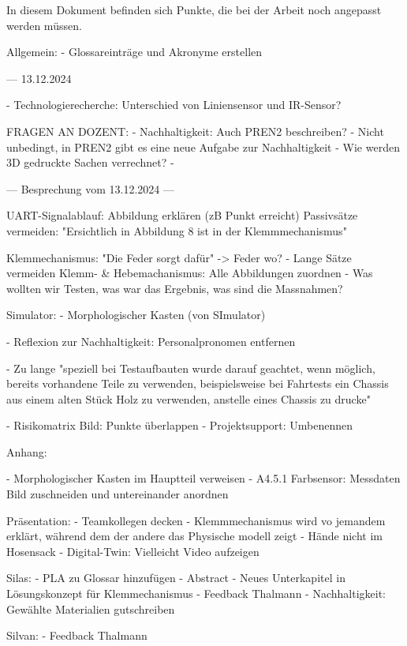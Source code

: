
In diesem Dokument befinden sich Punkte, die bei der Arbeit noch angepasst werden müssen.

Allgemein:
- Glossareinträge und Akronyme erstellen



--- 13.12.2024

- Technologierecherche: Unterschied von Liniensensor und IR-Sensor?




FRAGEN AN DOZENT:
- Nachhaltigkeit: Auch PREN2 beschreiben?
  - Nicht unbedingt, in PREN2 gibt es eine neue Aufgabe zur Nachhaltigkeit
- Wie werden 3D gedruckte Sachen verrechnet?
  - 


--- Besprechung vom 13.12.2024 ---

UART-Signalablauf: Abbildung erklären (zB Punkt erreicht)
Passivsätze vermeiden: "Ersichtlich in Abbildung 8 ist in der Klemmmechanismus"

Klemmechanismus: "Die Feder  sorgt dafür" -> Feder wo?
- Lange Sätze vermeiden
Klemm- \& Hebemachanismus: Alle Abbildungen zuordnen
- Was wollten wir Testen, was  war das Ergebnis, was sind die Massnahmen?

Simulator:
- Morphologischer Kasten (von SImulator)



- Reflexion zur Nachhaltigkeit: Personalpronomen entfernen

- Zu lange "speziell bei Testaufbauten wurde darauf geachtet, wenn möglich, bereits
vorhandene Teile zu verwenden, beispielsweise bei Fahrtests ein Chassis aus einem alten Stück Holz zu verwenden, anstelle eines Chassis zu drucke"

- Risikomatrix Bild: Punkte überlappen
- Projektsupport: Umbenennen

Anhang:

- Morphologischer Kasten im Hauptteil verweisen
- A4.5.1 Farbsensor: Messdaten Bild zuschneiden und untereinander anordnen


Präsentation:
- Teamkollegen decken
- Klemmmechanismus wird vo jemandem erklärt, während dem der andere das Physische modell zeigt
- Hände nicht im Hosensack
- Digital-Twin: Vielleicht Video aufzeigen



Silas:
- PLA zu Glossar hinzufügen
- Abstract
- Neues Unterkapitel in Lösungskonzept für Klemmechanismus
- Feedback Thalmann
- Nachhaltigkeit: Gewählte Materialien gutschreiben

Silvan:
- Feedback Thalmann

